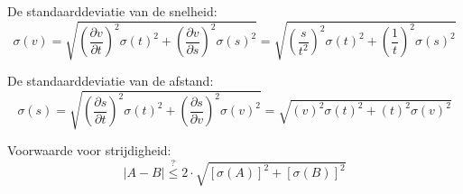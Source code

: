 \documentclass{report}
\begin{document}
\noindent
De standaarddeviatie van de snelheid: \cite{epo1-onzekerheden}
\begin{equation}
\label{eq:velError}
	\sigma(v) = \sqrt{\left (\frac{\partial v }{\partial t }\right)^2 \sigma(t)^2 + \left (\frac{\partial v }{\partial s }\right)^2 \sigma(s)^2} = \sqrt{\left (\frac{s }{{t}^2 }\right)^2 \sigma(t)^2 + \left (\frac{1}{t}\right)^2 \sigma(s)^2}
\end{equation}

\noindent
De standaarddeviatie van de afstand: \cite{epo1-onzekerheden}
\begin{equation}
\label{eq:distError}
	\sigma(s) = \sqrt{\left (\frac{\partial s }{\partial t }\right)^2 \sigma(t)^2 + \left (\frac{\partial s }{\partial v }\right)^2 \sigma(v)^2} = \sqrt{(v)^2 \sigma(t)^2 + (t)^2 \sigma(v)^2} 
\end{equation}

\noindent
Voorwaarde voor strijdigheid: \cite{epo1-onzekerheden}
\begin{equation}
\label{eq:strijdigheid}
	|A-B|\overset{?}{\le}2\cdot\sqrt{[\sigma(A)]^2+[\sigma(B)]^2}
\end{equation}
\end{document}
